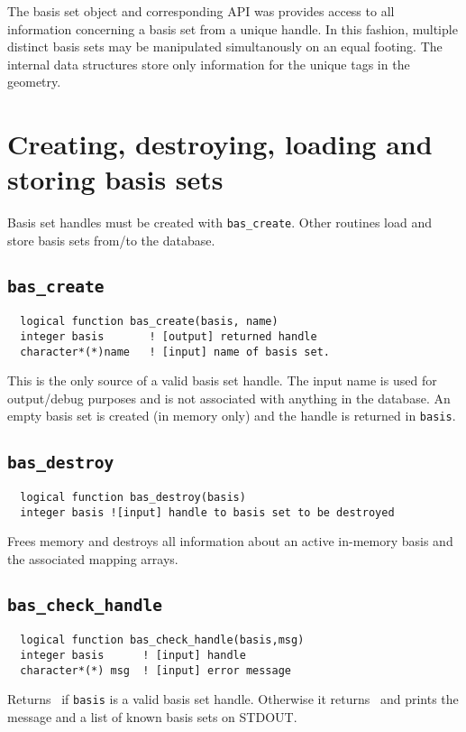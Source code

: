 

The basis set object and corresponding API was provides access to all
information concerning a basis set from a unique handle.  In this
fashion, multiple distinct basis sets may be manipulated simultanously
on an equal footing.  The internal data structures store only
information for the unique tags in the geometry.

\section{Creating, destroying, loading and storing basis sets}

Basis set handles must be created with \verb+bas_create+.  Other
routines load and store basis sets from/to the database.

\subsection{{\tt bas\_create}}
\begin{verbatim}
  logical function bas_create(basis, name)
  integer basis       ! [output] returned handle
  character*(*)name   ! [input] name of basis set.  
\end{verbatim}
This is the only source of a valid basis set handle.  The input name
is used for output/debug purposes and is not associated with anything
in the database.  An empty basis set is created (in memory only) and
the handle is returned in {\tt basis}.

\subsection{{\tt bas\_destroy}}
\begin{verbatim}
  logical function bas_destroy(basis)
  integer basis ![input] handle to basis set to be destroyed
\end{verbatim}
Frees memory and destroys all information about an active in-memory basis
and the associated mapping arrays.

\subsection{{\tt bas\_check\_handle}}
\begin{verbatim}
  logical function bas_check_handle(basis,msg)
  integer basis      ! [input] handle
  character*(*) msg  ! [input] error message
\end{verbatim}
Returns \TRUE\ if {\tt basis} is a valid basis set handle.  Otherwise
it returns \FALSE\ and prints the message and a list of known basis
sets on STDOUT.

